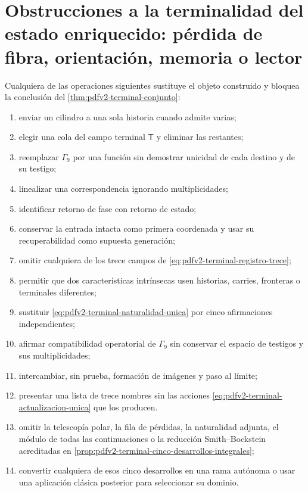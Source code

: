 \section{Obstrucciones a la terminalidad del estado enriquecido: pérdida de fibra, orientación, memoria o lector}

\begin{proposition}
\label{prop:pdfv2-terminal-falsadores}
Cualquiera de las operaciones siguientes sustituye el objeto construido y
bloquea la conclusi\'on del
\cref{thm:pdfv2-terminal-conjunto}:
\begin{enumerate}
 \item enviar un cilindro a una sola historia cuando admite varias;
 \item elegir una cola del campo terminal \(\mathsf T\) y eliminar las
       restantes;
 \item reemplazar \(\Gamma_9\) por una funci\'on sin demostrar unicidad de
       cada destino y de su testigo;
 \item linealizar una correspondencia ignorando multiplicidades;
 \item identificar retorno de fase con retorno de estado;
 \item conservar la entrada intacta como primera coordenada y usar su
       recuperabilidad como supuesta generaci\'on;
 \item omitir cualquiera de los trece campos de
       \eqref{eq:pdfv2-terminal-registro-trece};
 \item permitir que dos caracter\'isticas intr\'insecas usen historias,
       carries, fronteras o terminales diferentes;
 \item sustituir
       \eqref{eq:pdfv2-terminal-naturalidad-unica} por cinco afirmaciones
       independientes;
 \item afirmar compatibilidad operatorial de \(\Gamma_9\) sin conservar el
       espacio de testigos y sus multiplicidades;
 \item intercambiar, sin prueba, formaci\'on de im\'agenes y paso al l\'imite;
 \item presentar una lista de trece nombres sin las acciones
       \eqref{eq:pdfv2-terminal-actualizacion-unica} que los producen.
 \item omitir la telescopía polar, la fila de pérdidas, la naturalidad
       adjunta, el módulo de todas las continuaciones o la reducción
       Smith--Bockstein acreditadas en
       \cref{prop:pdfv2-terminal-cinco-desarrollos-integrales};
 \item convertir cualquiera de esos cinco desarrollos en una rama autónoma
       o usar una aplicación clásica posterior para seleccionar su dominio.
\end{enumerate}
\end{proposition}

